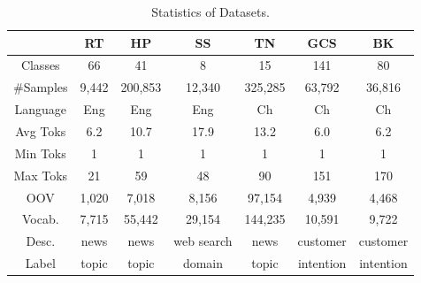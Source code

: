 \begin{table}[th]
	\scriptsize
	\centering
	\begin{tabular}{ccccccc}
		\toprule
		& RT & HP & SS & TN & GCS  & BK \\ \hline
		Classes       & 66      & 41    &8  & 15         & 141                & 80    \\
		\#Samples     & 9,442   &200,853   &12,340    & 325,285    & 63,792                &36,816      \\
		Language      & Eng      & Eng          & Eng    & Ch         & Ch   &Ch    \\
		Avg Toks& 6.2      &10.7    &17.9   & 13.2        &     6.0      &6.2      \\
		Min Toks& 1 &1 & 1&1         &1&1\\
		Max Toks& 21 &59 &48 & 90 & 151    &170 \\
		OOV &1,020&7,018&8,156 &97,154&4,939   &4,468\\
		Vocab. & 7,715&55,442&29,154&144,235&10,591     &9,722\\
		Desc.         & news & news &web search &news & customer  &customer \\ 
		Label         & topic     & topic    &domain    & topic   & intention                      &intention\\
		\bottomrule              
	\end{tabular}

%	
\caption{Statistics of Datasets.}
\label{table:statsOfDataset}
\end{table}

